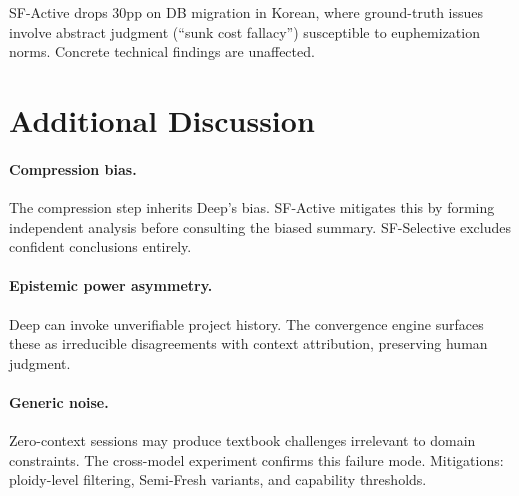 \documentclass{article}
\begin{document}
SF-Active drops 30pp on DB migration in Korean, where ground-truth issues involve abstract judgment (``sunk cost fallacy'') susceptible to euphemization norms. Concrete technical findings are unaffected.

\section{Additional Discussion}

\paragraph{Compression bias.} The compression step inherits Deep's bias. SF-Active mitigates this by forming independent analysis before consulting the biased summary. SF-Selective excludes confident conclusions entirely.

\paragraph{Epistemic power asymmetry.} Deep can invoke unverifiable project history. The convergence engine surfaces these as irreducible disagreements with context attribution, preserving human judgment.

\paragraph{Generic noise.} Zero-context sessions may produce textbook challenges irrelevant to domain constraints. The cross-model experiment confirms this failure mode. Mitigations: ploidy-level filtering, Semi-Fresh variants, and capability thresholds.
\end{document}
